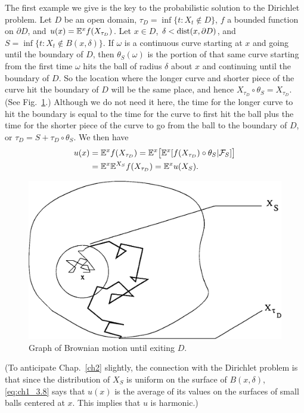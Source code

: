 The first example we give is the key to the probabilistic solution to the Dirichlet problem. Let $D$ be an open domain, $\tau_D = \inf\{t : X_t \notin D\}$, $f$ a bounded function on $\partial D$, and $u(x) = \mathbb{E}^x f(X_{\tau_D})$. Let $x \in D$, $\delta < \operatorname{dist}(x,\partial D)$, and $S = \inf\{t : X_t \notin B(x,\delta)\}$. If $\omega$ is a continuous curve starting at $x$ and going until the boundary of $D$, then $\theta_S(\omega)$ is the portion of that same curve starting from the first time $\omega$ hits the ball of radius $\delta$ about $x$ and continuing until the boundary of $D$. So the location where the longer curve and shorter piece of the curve hit the boundary of $D$ will be the same place, and hence $X_{\tau_D} \circ \theta_S = X_{\tau_D}$. (See Fig.\ \ref{fig:ch1_3.1}.) Although we do not need it here, the time for the longer curve to hit the boundary is equal to the time for the curve to first hit the ball plus the time for the shorter piece of the curve to go from the ball to the boundary of $D$, or $\tau_D = S + \tau_D \circ \theta_S$. We then have
\begin{align}\label{eq:ch1_3.8}
    u(x) &= \mathbb{E}^x f(X_{\tau_D}) = \mathbb{E}^x\big[\mathbb{E}^x[f(X_{\tau_D}) \circ \theta_S| \mathcal{F}_S]\big] \\
    &= \mathbb{E}^x\mathbb{E}^{X_S}f(X_{\tau_D}) = \mathbb{E}^xu(X_S). \notag
\end{align}

\bigskip
\begin{figure}[ht]
    \centering\includegraphics{Images/Img3.png}
    \caption{Graph of Brownian motion until exiting $D$.}
    \label{fig:ch1_3.1}
\end{figure}

(To anticipate Chap.\ \ref{ch2} slightly, the connection with the Dirichlet problem is that since the distribution of $X_S$ is uniform on the surface of $B(x,\delta)$, \eqref{eq:ch1_3.8} says that $u(x)$ is the average of its values on the surfaces of small balls centered at $x$. This implies that $u$ is harmonic.)

